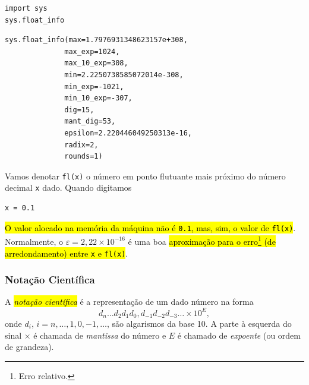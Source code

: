 \begin{lstlisting}
import sys
sys.float_info
\end{lstlisting}

\begin{verbatim}
sys.float_info(max=1.7976931348623157e+308, 
              max_exp=1024, 
              max_10_exp=308, 
              min=2.2250738585072014e-308, 
              min_exp=-1021, 
              min_10_exp=-307, 
              dig=15, 
              mant_dig=53, 
              epsilon=2.220446049250313e-16, 
              radix=2, 
              rounds=1)
\end{verbatim}

Vamos denotar \texttt{fl(x)} o número em ponto flutuante mais próximo do número decimal \texttt{x} dado. Quando digitamos

\begin{lstlisting}
x = 0.1
\end{lstlisting}

\hl{O valor alocado na memória da máquina não é \texttt{0.1}, mas, sim, o valor de \texttt{fl(x)}}. Normalmente, o  $\varepsilon = 2,22\times 10^{-16}$ é uma boa \hl{aproximação para o erro\footnote{Erro relativo.} (de arredondamento) entre \texttt{x} e \texttt{fl(x)}}.

\subsubsection{Notação Científica}

A \hl{\emph{notação científica}} é a representação de um dado número na forma
\begin{equation}
  d_{n}\ldots d_2d_1d_0,d_{-1}d_{-2}d_{-3}\ldots \times 10^{E},
\end{equation}
onde $d_i$, $i=n, \ldots, 1, 0, -1, \ldots$, são algarismos da base 10. A parte à esquerda do sinal $\times$ é chamada de \emph{mantissa} do número e $E$ é chamado de \emph{expoente} (ou ordem de grandeza).

